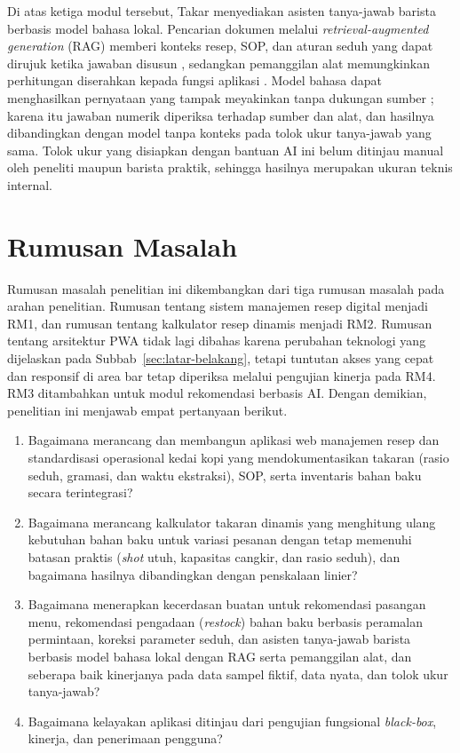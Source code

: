 Di atas ketiga modul tersebut, Takar menyediakan asisten tanya-jawab barista berbasis model bahasa lokal. Pencarian dokumen melalui \textit{retrieval-augmented generation} (RAG) memberi konteks resep, SOP, dan aturan seduh yang dapat dirujuk ketika jawaban disusun \citep{lewis2020retrievalaugmented}, sedangkan pemanggilan alat memungkinkan perhitungan diserahkan kepada fungsi aplikasi \citep{schick2023toolformer}. Model bahasa dapat menghasilkan pernyataan yang tampak meyakinkan tanpa dukungan sumber \citep{ji2023survey}; karena itu jawaban numerik diperiksa terhadap sumber dan alat, dan hasilnya dibandingkan dengan model tanpa konteks pada tolok ukur tanya-jawab yang sama. Tolok ukur yang disiapkan dengan bantuan AI ini belum ditinjau manual oleh peneliti maupun barista praktik, sehingga hasilnya merupakan ukuran teknis internal.

\section{Rumusan Masalah}
\label{sec:rumusan-masalah}

Rumusan masalah penelitian ini dikembangkan dari tiga rumusan masalah pada arahan penelitian. Rumusan tentang sistem manajemen resep digital menjadi RM1, dan rumusan tentang kalkulator resep dinamis menjadi RM2. Rumusan tentang arsitektur PWA tidak lagi dibahas karena perubahan teknologi yang dijelaskan pada Subbab~\ref{sec:latar-belakang}, tetapi tuntutan akses yang cepat dan responsif di area bar tetap diperiksa melalui pengujian kinerja pada RM4. RM3 ditambahkan untuk modul rekomendasi berbasis AI. Dengan demikian, penelitian ini menjawab empat pertanyaan berikut.

\begin{enumerate}[label=\textbf{RM\arabic*}, leftmargin=*, labelsep=1em]
\item Bagaimana merancang dan membangun aplikasi web manajemen resep dan standardisasi operasional kedai kopi yang mendokumentasikan takaran (rasio seduh, gramasi, dan waktu ekstraksi), SOP, serta inventaris bahan baku secara terintegrasi?
\item Bagaimana merancang kalkulator takaran dinamis yang menghitung ulang kebutuhan bahan baku untuk variasi pesanan dengan tetap memenuhi batasan praktis (\textit{shot} utuh, kapasitas cangkir, dan rasio seduh), dan bagaimana hasilnya dibandingkan dengan penskalaan linier?
\item Bagaimana menerapkan kecerdasan buatan untuk rekomendasi pasangan menu, rekomendasi pengadaan (\textit{restock}) bahan baku berbasis peramalan permintaan, koreksi parameter seduh, dan asisten tanya-jawab barista berbasis model bahasa lokal dengan RAG serta pemanggilan alat, dan seberapa baik kinerjanya pada data sampel fiktif, data nyata, dan tolok ukur tanya-jawab?
\item Bagaimana kelayakan aplikasi ditinjau dari pengujian fungsional \textit{black-box}, kinerja, dan penerimaan pengguna?
\end{enumerate}

